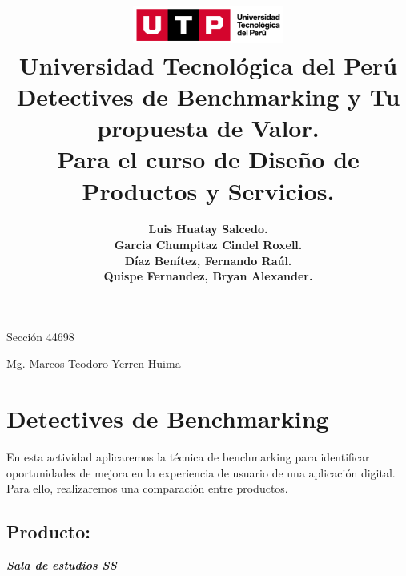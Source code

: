 \documentclass{article}
\title{
  \includegraphics[width=5cm]{./assets/logo-utp.png} \\
  \vspace{1cm}
  \textbf{Universidad Tecnológica del Perú} \\
  \vspace{2cm}
  \textbf{Detectives de Benchmarking y Tu propuesta de Valor.} \\
  \vspace{1cm}
  \large \textbf{Para el curso de Diseño de Productos y Servicios.}
}
\author{
  \textbf{Luis Huatay Salcedo.} \\
  \textbf{Garcia Chumpitaz Cindel Roxell.} \\
  \textbf{Díaz Benítez, Fernando Raúl.} \\
  \textbf{Quispe Fernandez, Bryan Alexander.}
}
\begin{document}
\maketitle
\begin{center}
  Sección 44698
\end{center}
\thispagestyle{empty}
\begin{center}
  Mg. Marcos Teodoro Yerren Huima  
\end{center}
\restoregeometry




\newpage


\section{Detectives de Benchmarking}

En esta actividad aplicaremos la técnica de benchmarking para identificar oportunidades de mejora en la experiencia de usuario de una aplicación digital. Para ello, realizaremos una comparación entre productos.

\subsection*{Producto:}
\textit{\textbf{Sala de estudios SS }}
\end{document}
